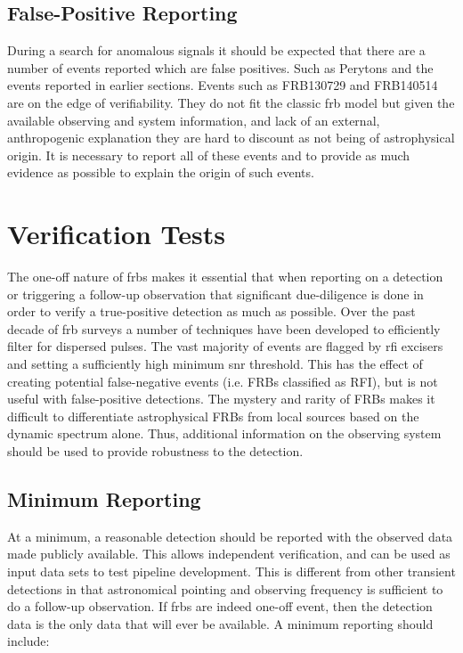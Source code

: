 \documentclass[a4paper,fleqn,usenatbib]{mnras}
\begin{document}
\subsection{False-Positive Reporting}

During a search for anomalous signals it should be expected that there are a
number of events reported which are false positives. Such as Perytons
\citep{2011ApJ...727...18B} and the events reported in earlier sections. Events
such as FRB130729 and FRB140514 are on the edge of verifiability. They do not
fit the classic \gls{frb} model but given the available observing and system
information, and lack of an external, anthropogenic explanation they are hard
to discount as not being of astrophysical origin. It is necessary to report
all of these events and to provide as much evidence as possible to explain the
origin of such events.

\section{Verification Tests}

The one-off nature of \glspl{frb} makes it essential that when reporting on a
detection or triggering a follow-up observation that significant due-diligence
is done in order to verify a true-positive detection as much as possible. Over the
past decade of \gls{frb} surveys a number of techniques have been developed to
efficiently filter for dispersed pulses. The vast majority of events are flagged
by \gls{rfi} excisers and setting a sufficiently high minimum \gls{snr}
threshold. This has the effect of creating potential false-negative events (i.e.
FRBs classified as RFI), but is not useful with false-positive detections. The
mystery and rarity of FRBs makes it difficult to differentiate astrophysical FRBs
from local sources based on the dynamic spectrum alone. Thus, additional
information on the observing system should be used to provide robustness to the
detection.


\subsection{Minimum Reporting}

At a minimum, a reasonable detection should be reported with the observed data
made publicly available.  This allows independent verification, and can be used
as input data sets to test pipeline development.  This is different from other
transient detections in that astronomical pointing and observing frequency is
sufficient to do a follow-up observation. If \glspl{frb} are indeed one-off
event, then the detection data is the only data that will ever be available. A
minimum reporting should include:
\end{document}
